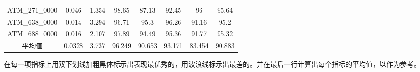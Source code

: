 \begin{table}[ht]
\begin{tabular}{cccccccc}
        ATM\_271\_0000 & 0.046          & 1.354          & 98.65          & 87.13          & 92.45          & 96             & 95.64          \\
        ATM\_638\_0000 & 0.014          & 3.294          & 96.71          & 95.3           & 96.26          & 91.16          & 95.2           \\
        ATM\_688\_0000 & 0.016          & 2.107          & 97.89          & 94.49          & 95.36          & 91.77          & 95.32          \\
        \midrule
        平均值          & 0.0328         & 3.737          & 96.249         & 90.653         & 93.171         & 83.454         & 90.883         \\
        \bottomrule
    \end{tabular}
\end{table}
在每一项指标上用双下划线加粗黑体标示出表现最优秀的，用波浪线标示出最差的。并在最后一行计算出每个指标的平均值，以作为参考。

